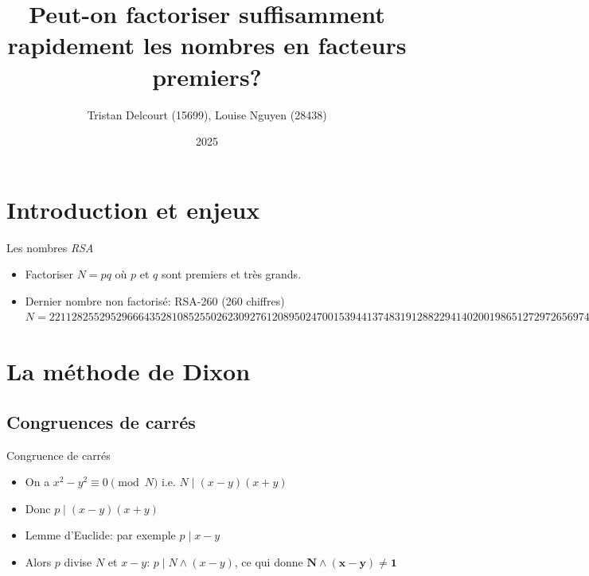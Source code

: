 \documentclass{beamer}
\title{Peut-on factoriser suffisamment rapidement les nombres en facteurs premiers?}
\author{Tristan Delcourt (15699), Louise Nguyen (28438)}
\date{2025}
\begin{document}
\begin{frame}[plain]
    \titlepage
\end{frame}

\section{Introduction et enjeux}
\begin{frame}{Les nombres \textit{RSA}}

\begin{itemize}
    \item Factoriser $N = pq$ où $p$ et $q$ sont premiers et très grands.
    \item Dernier nombre non factorisé: RSA-260 (260 chiffres)
        \newline
        \newline
        $N=221128255295296664352810852550262309276120895\allowbreak
        0247001539441374831912882294140200198651272972656\allowbreak
        9746599085900330031400051170742204560859276357953\allowbreak
        7571859542988389587092292384910067030341246205457\allowbreak
        8456641366454068421436129301769402084639106587591\allowbreak
        4794251435144458199$
\end{itemize}

\end{frame}

\section{La méthode de Dixon}
\subsection{Congruences de carrés}
\begin{frame}{Congruence de carrés}

\begin{itemize}[<+->]
\item On a $x^2 - y^2 \equiv 0 \pmod N$ i.e. $N \mid (x-y)(x+y)$
\item Donc $p \mid (x-y)(x+y)$
\item Lemme d'Euclide: par exemple $p \mid x-y$
\item Alors $p$ divise $N$ et $x-y$: $p \mid N \land (x-y)$, ce qui donne $\mathbf{N \land(x-y)\neq1}$
\end{itemize}

    
\end{frame}
\end{document}
